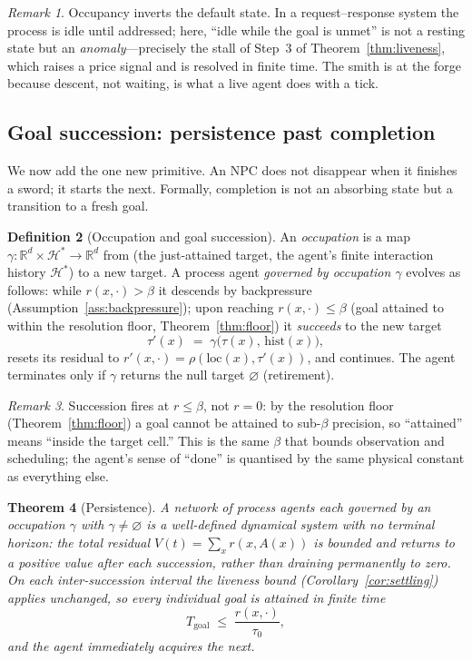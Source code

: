 \documentclass[11pt,twocolumn,a4paper]{article}
\theoremstyle{plain}
\newtheorem{theorem}{Theorem}[section]
\theoremstyle{definition}
\newtheorem{definition}[theorem]{Definition}
\theoremstyle{remark}
\newtheorem{remark}[theorem]{Remark}
\newcommand{\R}{\mathbb{R}}
\newcommand{\tick}{\tau_0}
\newcommand{\floor}{\beta}
\begin{document}
\begin{remark}
Occupancy inverts the default state. In a request--response system the process is
idle until addressed; here, ``idle while the goal is unmet'' is not a resting state
but an \emph{anomaly}---precisely the stall of Step~3 of Theorem~\ref{thm:liveness},
which raises a price signal and is resolved in finite time. The smith is at the
forge because descent, not waiting, is what a live agent does with a tick.
\end{remark}

\subsection{Goal succession: persistence past completion}

We now add the one new primitive. An NPC does not disappear when it finishes a
sword; it starts the next. Formally, completion is not an absorbing state but a
transition to a fresh goal.

\begin{definition}[Occupation and goal succession]
\label{def:succession}
An \emph{occupation} is a map $\gamma : \R^d \times \mathcal{H}^* \to \R^d$ from
(the just-attained target, the agent's finite interaction history $\mathcal{H}^*$)
to a new target. A process agent \emph{governed by occupation $\gamma$} evolves as
follows: while $r(x,\cdot) > \floor$ it descends by backpressure
(Assumption~\ref{ass:backpressure}); upon reaching $r(x,\cdot) \leq \floor$ (goal
attained to within the resolution floor, Theorem~\ref{thm:floor}) it \emph{succeeds}
to the new target
\[
  \tau'(x) \;=\; \gamma\bigl(\tau(x),\, \mathrm{hist}(x)\bigr),
\]
resets its residual to $r'(x,\cdot) = \rho(\mathrm{loc}(x), \tau'(x))$, and
continues. The agent terminates only if $\gamma$ returns the null target
$\varnothing$ (retirement).
\end{definition}

\begin{remark}
Succession fires at $r \leq \floor$, not $r = 0$: by the resolution floor
(Theorem~\ref{thm:floor}) a goal cannot be attained to sub-$\floor$ precision, so
``attained'' means ``inside the target cell.'' This is the same $\floor$
that bounds observation and scheduling; the agent's sense of ``done'' is quantised
by the same physical constant as everything else.
\end{remark}

\begin{theorem}[Persistence]
\label{thm:persistence}
A network of process agents each governed by an occupation $\gamma$ with
$\gamma \neq \varnothing$ is a well-defined dynamical system with no terminal
horizon: the total residual $V(t) = \sum_x r(x, A(x))$ is bounded and returns to a
positive value after each succession, rather than draining permanently to zero. On
each inter-succession interval the liveness bound (Corollary~\ref{cor:settling})
applies unchanged, so every individual goal is attained in finite time
\[
  T_{\mathrm{goal}} \;\leq\; \frac{r(x,\cdot)}{\tick},
\]
and the agent immediately acquires the next.
\end{theorem}
\end{document}
